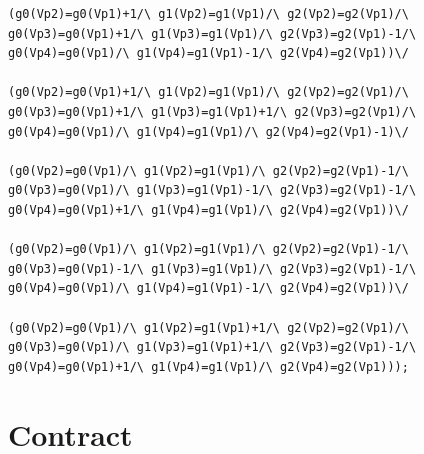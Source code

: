 \begin{appendices}
\begin{lstlisting}
(g0(Vp2)=g0(Vp1)+1/\ g1(Vp2)=g1(Vp1)/\ g2(Vp2)=g2(Vp1)/\ g0(Vp3)=g0(Vp1)+1/\ g1(Vp3)=g1(Vp1)/\ g2(Vp3)=g2(Vp1)-1/\ g0(Vp4)=g0(Vp1)/\ g1(Vp4)=g1(Vp1)-1/\ g2(Vp4)=g2(Vp1))\/ 

(g0(Vp2)=g0(Vp1)+1/\ g1(Vp2)=g1(Vp1)/\ g2(Vp2)=g2(Vp1)/\ g0(Vp3)=g0(Vp1)+1/\ g1(Vp3)=g1(Vp1)+1/\ g2(Vp3)=g2(Vp1)/\ g0(Vp4)=g0(Vp1)/\ g1(Vp4)=g1(Vp1)/\ g2(Vp4)=g2(Vp1)-1)\/ 

(g0(Vp2)=g0(Vp1)/\ g1(Vp2)=g1(Vp1)/\ g2(Vp2)=g2(Vp1)-1/\ g0(Vp3)=g0(Vp1)/\ g1(Vp3)=g1(Vp1)-1/\ g2(Vp3)=g2(Vp1)-1/\ g0(Vp4)=g0(Vp1)+1/\ g1(Vp4)=g1(Vp1)/\ g2(Vp4)=g2(Vp1))\/ 

(g0(Vp2)=g0(Vp1)/\ g1(Vp2)=g1(Vp1)/\ g2(Vp2)=g2(Vp1)-1/\ g0(Vp3)=g0(Vp1)-1/\ g1(Vp3)=g1(Vp1)/\ g2(Vp3)=g2(Vp1)-1/\ g0(Vp4)=g0(Vp1)/\ g1(Vp4)=g1(Vp1)-1/\ g2(Vp4)=g2(Vp1))\/ 

(g0(Vp2)=g0(Vp1)/\ g1(Vp2)=g1(Vp1)+1/\ g2(Vp2)=g2(Vp1)/\ g0(Vp3)=g0(Vp1)/\ g1(Vp3)=g1(Vp1)+1/\ g2(Vp3)=g2(Vp1)-1/\ g0(Vp4)=g0(Vp1)+1/\ g1(Vp4)=g1(Vp1)/\ g2(Vp4)=g2(Vp1)));
\end{lstlisting}
\section{Contract}
\label{appendix:contract}

\end{appendices}